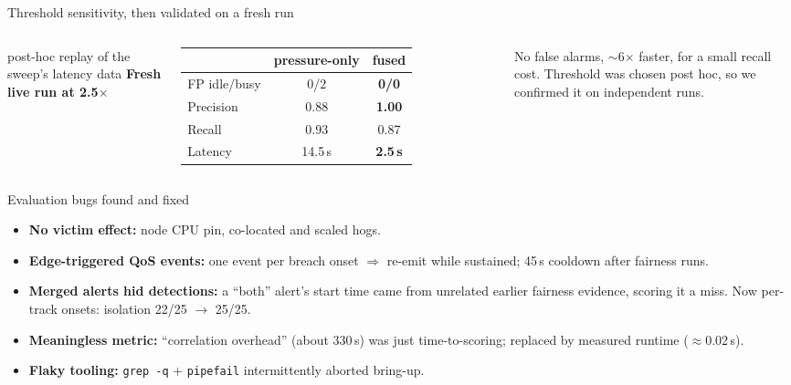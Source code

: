 \documentclass[aspectratio=169,11pt]{beamer}
\begin{document}
\begin{frame}{Threshold sensitivity, then validated on a fresh run}
\begin{columns}[c]

\scriptsize post-hoc replay of the sweep's latency data
\small
\textbf{Fresh live run at 2.5$\times$}\par\vspace{1mm}
\begin{tabular}{lcc}
\toprule
 & pressure-only & \textbf{fused}\\
\midrule
FP idle/busy & 0/2 & \textbf{0/0}\\
Precision & 0.88 & \textbf{1.00}\\
Recall & 0.93 & 0.87\\
Latency & 14.5\,s & \textbf{2.5\,s}\\
\bottomrule
\end{tabular}
\vspace{2mm}

\normalsize
\alert{No false alarms, $\sim$6$\times$ faster}, for a small recall cost. Threshold was chosen post hoc, so we confirmed it on independent runs.
\end{columns}
\end{frame}

\begin{frame}{Evaluation bugs found and fixed}
\small
\begin{itemize}
\item \textbf{No victim effect:} node CPU pin, co-located and scaled hogs.
\item \textbf{Edge-triggered QoS events:} one event per breach onset $\Rightarrow$ re-emit while sustained; 45\,s cooldown after fairness runs.
\item \textbf{Merged alerts hid detections:} a ``both'' alert's start time came from unrelated earlier fairness evidence, scoring it a miss. Now per-track onsets: isolation 22/25 $\to$ \alert{25/25}.
\item \textbf{Meaningless metric:} ``correlation overhead'' (about 330\,s) was just time-to-scoring; replaced by measured runtime ($\approx$0.02\,s).
\item \textbf{Flaky tooling:} \texttt{grep -q} + \texttt{pipefail} intermittently aborted bring-up.
\end{itemize}
\end{frame}
\end{document}
